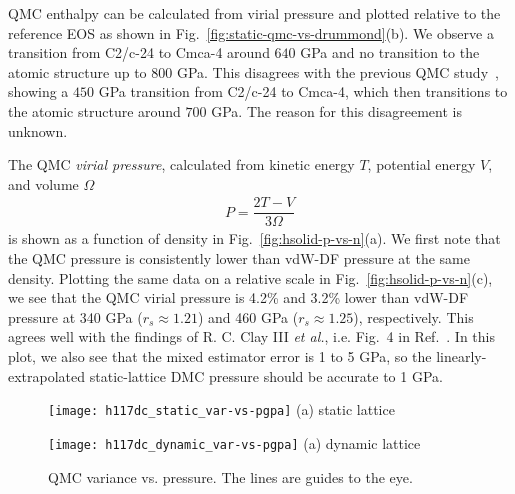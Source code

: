 QMC enthalpy can be calculated from virial pressure and plotted relative to the reference EOS as shown in Fig.~\ref{fig:static-qmc-vs-drummond}(b). We observe a transition from C2/c-24 to Cmca-4 around $640$ GPa and no transition to the atomic structure up to $800$ GPa.
This disagrees with the previous QMC study~\cite{McMinis2015}, showing a $450$ GPa transition from C2/c-24 to Cmca-4, which then transitions to the atomic structure around $700$ GPa.
The reason for this disagreement is unknown.

The QMC \emph{virial pressure}, calculated from kinetic energy $T$, potential energy $V$, and volume $\Omega$
\begin{align}
P = \dfrac{2T-V}{3\Omega}
\end{align}
is shown as a function of density in Fig.~\ref{fig:hsolid-p-vs-n}(a).
We first note that the QMC pressure is consistently lower than vdW-DF pressure at the same density.
Plotting the same data on a relative scale in Fig.~\ref{fig:hsolid-p-vs-n}(c),
we see that the QMC virial pressure is 4.2\% and 3.2\% lower than vdW-DF pressure at 340 GPa ($r_s\approx 1.21$) and 460 GPa ($r_s\approx 1.25$), respectively. This agrees well with the findings of R. C. Clay III \textit{et al.}, i.e. Fig.~4 in Ref.~\cite{Clay2016}.
In this plot, we also see that the mixed estimator error is 1 to 5 GPa, so the linearly-extrapolated static-lattice DMC pressure should be accurate to 1 GPa.

\begin{figure}[ht]
	\centering
	\begin{minipage}{0.49\linewidth}
		\centering
		\texttt{[image: h117dc\_static\_var-vs-pgpa]}
		(a) static lattice
	\end{minipage}
	\centering
	\begin{minipage}{0.49\linewidth}
		\centering
		\texttt{[image: h117dc\_dynamic\_var-vs-pgpa]}
		(a) dynamic lattice
	\end{minipage}
	\caption{QMC variance vs. pressure. The lines are guides to the eye.}
	\label{fig:hsolid-v-vs-p}
\end{figure}

